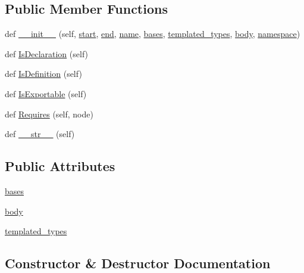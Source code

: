 \subsection*{Public Member Functions}
\begin{DoxyCompactItemize}
\item 
def \hyperlink{classcpp_1_1ast_1_1_class_acc17c34512d5cc54d5125734ce79f219}{\+\_\+\+\_\+init\+\_\+\+\_\+} (self, \hyperlink{classcpp_1_1ast_1_1_node_a7b2aa97e6a049bb1a93aea48c48f1f44}{start}, \hyperlink{classcpp_1_1ast_1_1_node_a3c5e5246ccf619df28eca02e29d69647}{end}, \hyperlink{classcpp_1_1ast_1_1___generic_declaration_af774f4729dfd78d0538a6782fe8514c1}{name}, \hyperlink{classcpp_1_1ast_1_1_class_a5665eb67314a075d4e0ff91accbde5d1}{bases}, \hyperlink{classcpp_1_1ast_1_1_class_a48ed0d3115656554d9134bc1787390fa}{templated\+\_\+types}, \hyperlink{classcpp_1_1ast_1_1_class_add39f61fdcf6dae42d79cac3dcbb7782}{body}, \hyperlink{classcpp_1_1ast_1_1___generic_declaration_a8aee3f11b37449d54b42a78e0a689f46}{namespace})
\item 
def \hyperlink{classcpp_1_1ast_1_1_class_a4758bfb7c00410575932974e1ed8b7da}{Is\+Declaration} (self)
\item 
def \hyperlink{classcpp_1_1ast_1_1_class_ae6d2356f835d06d5109d9e4609d86780}{Is\+Definition} (self)
\item 
def \hyperlink{classcpp_1_1ast_1_1_class_a1ab749f8cfddb0903c6484791f70f42e}{Is\+Exportable} (self)
\item 
def \hyperlink{classcpp_1_1ast_1_1_class_a347673e0a2a7b840b7d2d1cae13977f7}{Requires} (self, node)
\item 
def \hyperlink{classcpp_1_1ast_1_1_class_a0a63f6fab75d61ffac6fb9f1c29ae84d}{\+\_\+\+\_\+str\+\_\+\+\_\+} (self)
\end{DoxyCompactItemize}
\subsection*{Public Attributes}
\begin{DoxyCompactItemize}
\item 
\hyperlink{classcpp_1_1ast_1_1_class_a5665eb67314a075d4e0ff91accbde5d1}{bases}
\item 
\hyperlink{classcpp_1_1ast_1_1_class_add39f61fdcf6dae42d79cac3dcbb7782}{body}
\item 
\hyperlink{classcpp_1_1ast_1_1_class_a48ed0d3115656554d9134bc1787390fa}{templated\+\_\+types}
\end{DoxyCompactItemize}


\subsection{Constructor \& Destructor Documentation}
\mbox{\label{classcpp_1_1ast_1_1_class_acc17c34512d5cc54d5125734ce79f219}} 
